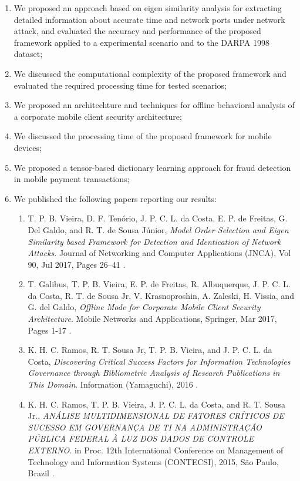 \begin{enumerate}
	\item We proposed an approach based on eigen similarity analysis for extracting detailed information about accurate time and network ports under network attack, and evaluated the accuracy and performance of the proposed framework applied to a experimental scenario and to the DARPA 1998 dataset;
	\item We discussed the computational complexity of the proposed framework and evaluated the required processing time for tested scenarios;
	\item We proposed an architechture and techniques for offline behavioral analysis of a corporate mobile client security architecture;
	\item We discussed the processing time of the proposed framework for mobile devices;
	\item We proposed a tensor-based dictionary learning approach for fraud detection in mobile payment transactions;
	\item We published the following papers reporting our results:
	\begin{enumerate}
		\item T. P. B. Vieira, D. F. Ten\'orio, J. P. C. L. da Costa, E. P. de Freitas, G. Del Galdo, and R. T. de Sousa J\'unior, \textit{Model Order Selection and Eigen Similarity based Framework for Detection and Identication of Network Attacks}. Journal of Networking and Computer Applications (JNCA), Vol 90, Jul 2017, Pages 26–41 \cite{vieira2017model}.
		\item T. Galibus, T. P. B. Vieira, E. P. de Freitas, R. Albuquerque, J. P. C. L. da Costa, R. T. de Sousa Jr, V. Krasnoproshin, A. Zaleski, H. Vissia, and G. del Galdo, \textit{Offline Mode for Corporate Mobile Client Security Architecture}. Mobile Networks and Applications, Springer, Mar 2017, Pages 1-17 \cite{galibus2017offline}.
		\item K. H. C. Ramos, R. T. Sousa Jr, T. P. B. Vieira, and J. P. C. L. da Costa, \textit{Discovering Critical Success Factors for Information Technologies Governance through Bibliometric Analysis of Research Publications in This Domain}. Information (Yamaguchi), 2016 \cite{ramos2016information}.
		\item K. H. C. Ramos, T. P. B. Vieira, J. P. C. L. da Costa, and R. T. Sousa Jr., \textit{ANÁLISE MULTIDIMENSIONAL DE FATORES CRÍTICOS DE SUCESSO EM GOVERNANÇA DE TI NA ADMINISTRAÇÃO PÚBLICA FEDERAL À LUZ DOS DADOS DE CONTROLE EXTERNO}. in Proc. 12th International Conference on Management of Technology and Information Systems (CONTECSI), 2015, São Paulo, Brazil \cite{}.
	\end{enumerate}
\end{enumerate}


